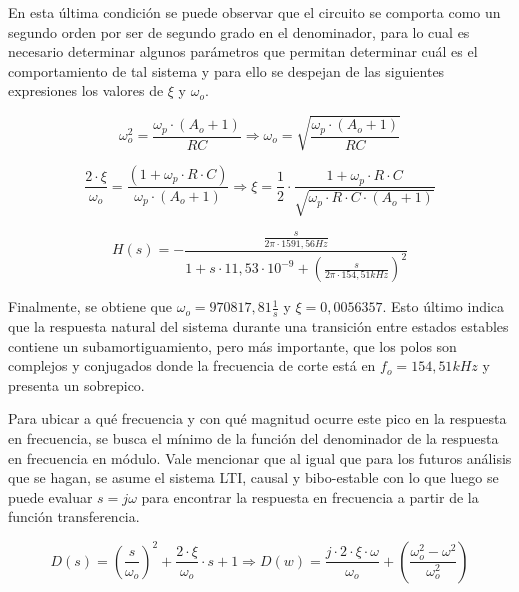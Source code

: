 En esta \'ultima condici\'on se puede observar que el circuito se comporta como un segundo orden por ser de segundo grado en el denominador, para lo cual es necesario determinar algunos par\'ametros que permitan determinar cu\'al es el comportamiento de tal sistema y para ello se despejan de las siguientes expresiones los valores de $\xi$ y $\omega_o$.

\begin{equation*}
	\omega_o^{2} = \frac{\omega_p \cdot (A_o + 1)}{RC} \Rightarrow \omega_o = \sqrt{\frac{\omega_p \cdot (A_o + 1)}{RC}}	
\end{equation*}

\begin{equation*}
	\frac{2 \cdot \xi}{\omega_o} = \frac{(1 + \omega_p \cdot R \cdot C)}{\omega_p \cdot(A_o + 1)}
	\Rightarrow \xi = \frac{1}{2} \cdot \frac{1 + \omega_p \cdot R \cdot C}{\sqrt{\omega_p \cdot R \cdot C \cdot (A_o + 1)}}
\end{equation*}

\begin{equation}
	H(s) = - \frac{\frac{s}{2 \pi \cdot 1591,56Hz}}
	{1 + s \cdot 11,53 \cdot 10^{-9} + \left( \frac{s}{2 \pi \cdot 154,51kHz} \right)^{2}}
	\label{eq:derivador_transfer_polo_dominante}
\end{equation}

Finalmente, se obtiene que $\omega_o = 970817,81 \frac{1}{s}$ y $\xi = 0,0056357$. Esto \'ultimo indica que la respuesta natural del sistema durante una transici\'on entre estados estables contiene un subamortiguamiento, pero m\'as importante, que los polos son complejos y conjugados donde la frecuencia de corte est\'a en $f_o = 154,51kHz$ y presenta un sobrepico.

Para ubicar a qu\'e frecuencia y con qu\'e magnitud ocurre este pico en la respuesta en frecuencia, se busca el m\'inimo de la funci\'on del denominador de la respuesta en frecuencia en m\'odulo. Vale mencionar que al igual que para los futuros an\'alisis que se hagan, se asume el sistema LTI, causal y bibo-estable con lo que luego se puede evaluar $s = j \omega$ para encontrar la respuesta en frecuencia a partir de la funci\'on transferencia.

\begin{equation*}
	D(s) = \left( \frac{s}{\omega_o} \right)^{2} + \frac{2 \cdot \xi}{\omega_o} \cdot s + 1
	\Rightarrow
	D(w) = \frac{j \cdot 2 \cdot \xi \cdot \omega}{\omega_o} + \left( \frac{\omega_o^{2} - \omega^{2}}{\omega_o^{2}} \right)
\end{equation*}

